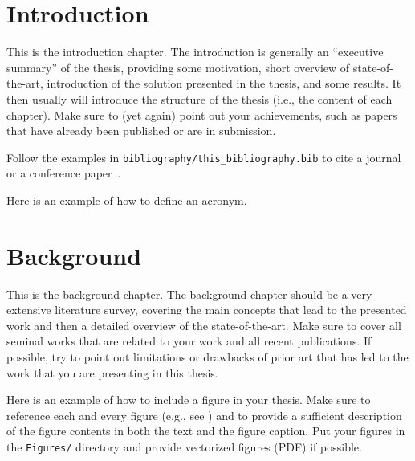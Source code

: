 \documentclass[a4paper,12pt,twoside,openany]{book}
\newcommand{\doctype}{msc-proposal}
\begin{document}
    \ifthenelse{\equal{\doctype}{phd-proposal}}{
        
        \clearpage
    }



\mainmatter
\chapter{Introduction}
\label{sec_intro}
\color{teal}
    This is the introduction chapter. The introduction is generally an ``executive summary'' of the thesis, providing some motivation, short overview of state-of-the-art, introduction of the solution presented in the thesis, and some results. It then usually will introduce the structure of the thesis (i.e., the content of each chapter). Make sure to (yet again) point out your achievements, such as papers that have already been published or are in submission.

\color{cyan}
    Follow the examples in \texttt{bibliography/this\_bibliography.bib} to cite a journal~\cite{nameYEARtitleJOURNAL} or a conference paper~\cite{nameYEARtitleCONFERENCE}.
    
    Here is an \gls{example} of how to define an acronym.
\color{black}


\chapter{Background}
\label{sec_background}
\color{teal}
    This is the background chapter. The background chapter should be a very extensive literature survey, covering the main concepts that lead to the presented work and then a detailed overview of the state-of-the-art. Make sure to cover all seminal works that are related to your work and all recent publications. If possible, try to point out limitations or drawbacks of prior art that has led to the work that you are presenting in this thesis.

\color{cyan}
    Here is an example of how to include a figure in your thesis. Make sure to reference each and every figure (e.g., see ) and to provide a sufficient description of the figure contents in both the text and the figure caption. Put your figures in the \texttt{Figures/} directory and provide vectorized figures (PDF) if possible. 
\end{document}

